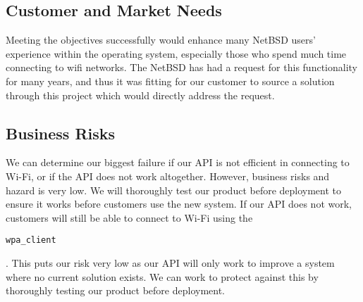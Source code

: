 \subsection{Customer and Market Needs}

Meeting the objectives successfully would enhance many NetBSD users' experience within the operating system, especially those who spend much time connecting to wifi networks. The NetBSD has had a request for this functionality for many years, and thus it was fitting for our customer to source a solution through this project which would directly address the request.

\subsection{Business Risks}

We can determine our biggest failure if our API is not efficient in connecting to Wi-Fi, or if the API does not work altogether. However, business risks 
and hazard is very low. We will thoroughly test our product before deployment to ensure it works before customers use the new system. If our API does not work, 
customers will still be able to connect to Wi-Fi using the \begin{verbatim}wpa_client\end{verbatim}. This puts our risk very low as our API will only work to improve a system where no current 
solution exists. We can work to protect against this by thoroughly testing our product before deployment. 

